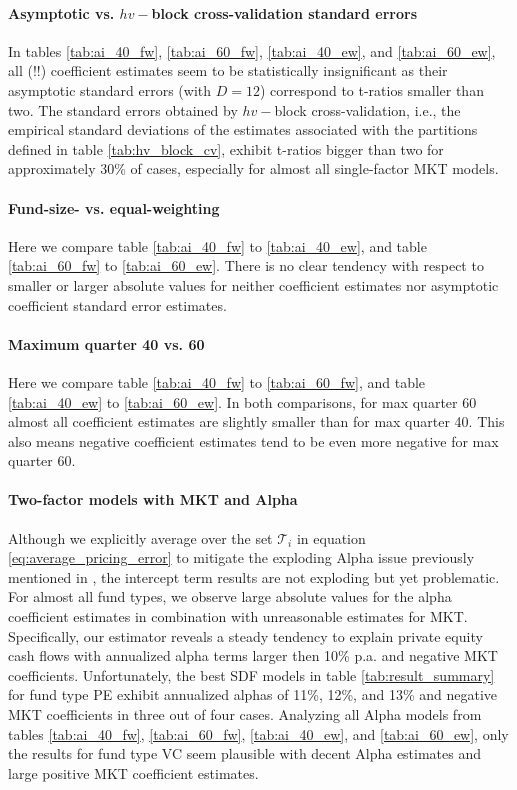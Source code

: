 \documentclass[12pt]{article}
\begin{document}
\paragraph{Asymptotic vs. $hv-$block cross-validation standard errors}

In tables \ref{tab:ai_40_fw}, \ref{tab:ai_60_fw}, \ref{tab:ai_40_ew}, and  \ref{tab:ai_60_ew}, all (!!) coefficient estimates seem to be statistically insignificant as their asymptotic standard errors (with $D=12$)  correspond to t-ratios smaller than two.
The standard errors obtained by $hv-$block cross-validation, i.e., the empirical standard deviations of the estimates associated with the partitions defined in table \ref{tab:hv_block_cv}, exhibit t-ratios bigger than two for approximately 30\% of cases, especially for almost all single-factor MKT models.

\paragraph{Fund-size- vs. equal-weighting}

Here we compare table \ref{tab:ai_40_fw} to \ref{tab:ai_40_ew}, and table \ref{tab:ai_60_fw} to \ref{tab:ai_60_ew}.
There is no clear tendency with respect to smaller or larger absolute values for neither coefficient estimates nor asymptotic coefficient standard error estimates.


\paragraph{Maximum quarter 40 vs. 60}

Here we compare table \ref{tab:ai_40_fw} to \ref{tab:ai_60_fw}, and table \ref{tab:ai_40_ew} to \ref{tab:ai_60_ew}.
In both comparisons, for max quarter 60 almost all coefficient estimates are slightly smaller than for max quarter 40.
This also means negative coefficient estimates tend to be even more negative for max quarter 60.


\paragraph{Two-factor models with MKT and Alpha}

Although we explicitly average over the set $\mathcal{T}_{i}$ in equation \ref{eq:average_pricing_error} to mitigate the exploding Alpha issue previously mentioned in \cite{DLP12}, the intercept term results are not exploding but yet problematic.
For almost all fund types, we observe large absolute values for the alpha coefficient estimates in combination with unreasonable estimates for MKT.
Specifically, our estimator reveals a steady tendency to explain private equity cash flows with annualized alpha terms larger then 10\% p.a. and negative MKT coefficients.
Unfortunately, the best SDF models in table \ref{tab:result_summary} for fund type PE exhibit annualized alphas of 11\%, 12\%, and 13\% and negative MKT coefficients in three out of four cases.
Analyzing all Alpha models from tables \ref{tab:ai_40_fw}, \ref{tab:ai_60_fw}, \ref{tab:ai_40_ew}, and  \ref{tab:ai_60_ew}, only the results for fund type VC seem plausible with decent Alpha estimates and large positive MKT coefficient estimates.
\end{document}
